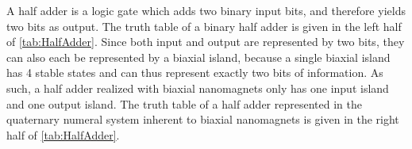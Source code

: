 \documentclass[twocolumn]{phdsymp}
\begin{document}
A half adder is a logic gate which adds two binary input bits, and therefore yields two bits as
output. The truth table of a binary half adder is given in the left half of \cref{tab:HalfAdder}. Since both input and output are represented by two bits, they can also each be represented by a biaxial island, because a single biaxial island has 4 stable states and can thus represent exactly two bits of information. As such, a half adder realized with biaxial nanomagnets only has one input island and one output island. The truth table of a half adder represented in the quaternary numeral system inherent to biaxial nanomagnets is given in the right half of \cref{tab:HalfAdder}.
\end{document}
